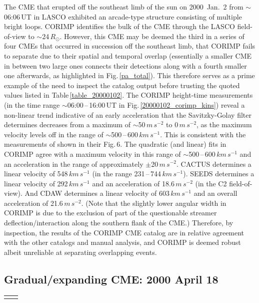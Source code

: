 \documentclass[referee,a4paper,12pt,traditabstract]{swsc}
\begin{document}
\begin{linenumbers}
The CME that erupted off the southeast limb of the sun on 2000~Jan.~2 from $\sim$06:06\,UT in LASCO exhibited an arcade-type structure consisting of multiple bright loops. CORIMP identifies the bulk of the CME through the LASCO field-of-view to $\sim$24\,$R_\odot$. However, this CME may be deemed the third in a series of four CMEs that occurred in succession off the southeast limb, that CORIMP fails to separate due to their spatial and temporal overlap (essentially a smaller CME in between two large ones connects their detections along with a fourth smaller one afterwards, as highlighted in Fig.\,\ref{pa_total}). This therefore serves as a prime example of the need to inspect the catalog output before trusting the quoted values listed in Table\,\ref{table_20000102}. The CORIMP height-time measurements (in the time range $\sim$06:00\,--\,16:00\,UT in Fig.\,\ref{20000102_corimp_kins}) reveal a non-linear trend indicative of an early acceleration that the Savitzky-Golay filter determines decreases from a maximum of $\sim$50\,$m\,s^{-2}$ to 0\,$m\,s^{-2}$, as the maximum velocity levels off in the range of $\sim$500\,--\,600\,$km\,s^{-1}$. This is consistent with the measurements of \cite{2009A&A...495..325B} shown in their Fig.\,6. The quadratic (and linear) fits in CORIMP agree with a maximum velocity in this range of $\sim$500\,--\,600\,$km\,s^{-1}$ and an acceleration in the range of approximately $\pm$20\,$m\,s^{-2}$. CACTUS determines a linear velocity of 548\,$km\,s^{-1}$ (in the range 231\,--\,744\,$km\,s^{-1}$). SEEDS determines a linear velocity of 292\,$km\,s^{-1}$ and an acceleration of 18.6\,$m\,s^{-2}$ (in the C2 field-of-view). And CDAW determines a linear velocity of 603\,$km\,s^{-1}$ and an overall acceleration of 21.6\,$m\,s^{-2}$. (Note that the slightly lower angular width in CORIMP is due to the exclusion of part of the questionable streamer deflection/interaction along the southern flank of the CME.) Therefore, by inspection, the results of the CORIMP CME catalog are in relative agreement with the other catalogs and manual analysis, and CORIMP is deemed robust albeit unreliable at separating overlapping events.


\subsection{Gradual/expanding CME: 2000 April 18}


\begin{table}[h]
\begin{tabular}{l*{4}{c}r}
\multicolumn{5}{c}{} \\


\end{tabular}
\end{table}
\end{linenumbers}
\end{document}
